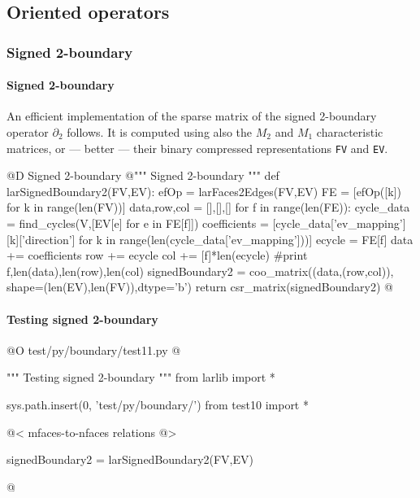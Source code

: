 \documentclass[11pt,oneside]{article}	%
\begin{document}
\subsection{Oriented operators}

\subsubsection{Signed 2-boundary}


\paragraph{Signed 2-boundary} An efficient implementation of the sparse matrix of the  signed 2-boundary operator $\partial_2$ follows.
It is computed using also the $M_2$ and $M_1$ characteristic matrices, or --- better --- their binary compressed representations \texttt{FV} and \texttt{EV}.

@D Signed 2-boundary
@{""" Signed 2-boundary """
def larSignedBoundary2(FV,EV):
	efOp = larFaces2Edges(FV,EV)
	FE = [efOp([k]) for k in range(len(FV))]
	data,row,col = [],[],[]
	for f in range(len(FE)):
		cycle_data = find_cycles(V,[EV[e] for e in FE[f]])
		coefficients = [cycle_data['ev_mapping'][k]['direction'] 
		      for k in range(len(cycle_data['ev_mapping']))]
		ecycle = FE[f]
		data += coefficients
		row += ecycle
		col += [f]*len(ecycle)
		#print f,len(data),len(row),len(col)
	signedBoundary2 = coo_matrix((data,(row,col)), shape=(len(EV),len(FV)),dtype='b')
	return csr_matrix(signedBoundary2)
@}


\paragraph{Testing signed 2-boundary}
@O test/py/boundary/test11.py
@{""" Testing signed 2-boundary """
from larlib import *

sys.path.insert(0, 'test/py/boundary/')
from test10 import *

@< mfaces-to-nfaces relations @>

signedBoundary2 = larSignedBoundary2(FV,EV)


@}
\end{document}
